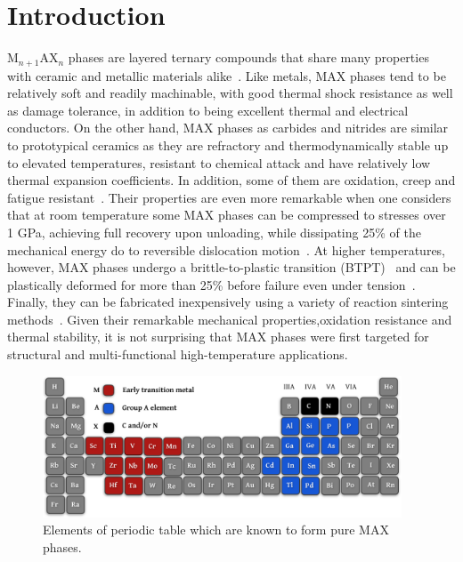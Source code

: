 \documentclass[preprint,amsmath,amssymb,aps, prb,showkeys]{revtex4-1}
\begin{document}
\section{Introduction}
\label{sec:Intro}
M$_{n+1}$AX$_n$ phases are layered ternary compounds that share many properties with ceramic and metallic materials alike~\cite{barsoum2013max, radovic2013max, barsoum2000, barsoum2004,barsoum2011elastic,sun2011progress}. Like metals, MAX phases tend to be relatively soft and readily machinable, with good thermal shock resistance as well as damage tolerance, in addition to being excellent thermal and electrical conductors. On the other hand, MAX phases as carbides and nitrides are similar to prototypical ceramics as they are refractory and thermodynamically stable up to elevated temperatures, resistant to chemical attack and have relatively low thermal expansion coefficients. In addition, some of them are oxidation, creep and fatigue resistant~\cite{radovic2013max}. Their properties are even more remarkable when one considers that at room temperature some MAX phases can be compressed to stresses over 1 GPa, achieving full recovery upon unloading, while dissipating 25\% of the mechanical energy do to reversible dislocation motion~\cite{
barsoum2003fully}. At higher temperatures, however, MAX phases undergo a brittle-to-plastic transition (BTPT)~\cite{benitez2016room} and can be plastically deformed for more than 25\% before failure even under tension~\cite{radovic2002effect}. Finally, they can be fabricated inexpensively using a variety of reaction sintering methods~\cite{sun2011progress,wang2010layered,barsoum2013max}. Given their remarkable mechanical properties,oxidation resistance and thermal stability, it is not surprising that MAX phases were first targeted for structural and multi-functional high-temperature applications. 

\begin{figure}
\centering
\includegraphics[width=0.95\textwidth]{figure_1}
\caption{Elements of periodic table which are known to form pure MAX phases.}
\label{fig:MAX_periodic_table}
\end{figure}
\end{document}
